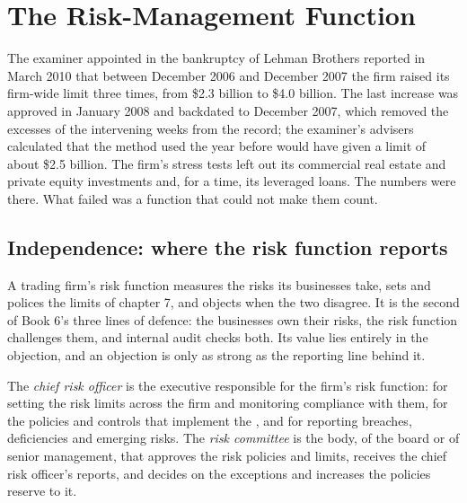 \chapter{The Risk-Management Function}\label{ch:fm:the-risk-management-function}

The examiner appointed in the bankruptcy of Lehman Brothers reported in March 2010 that between December 2006 and December 2007 the firm raised its
firm-wide  limit three times, from \$2.3 billion to \$4.0 billion. The last increase was approved in January 2008 and backdated to
December 2007, which removed the excesses of the intervening weeks from the record; the examiner's advisers calculated that the method used the year
before would have given a limit of about \$2.5 billion. The firm's stress tests left out its commercial real estate and private equity investments
and, for a time, its leveraged loans. The numbers were there. What failed was a function that could not make them count.

\section{Independence: where the risk function reports}

A trading firm's risk function measures the risks its businesses take, sets and polices the limits of chapter 7, and objects when the two disagree.
It is the second of Book 6's three lines of defence: the businesses own their risks, the risk function challenges them, and internal audit checks
both. Its value lies entirely in the objection, and an objection is only as strong as the reporting line behind it.

\begin{definition}\label{def:fm:the-risk-management-function:cro}
The \emph{chief risk officer} is the executive responsible for the firm's risk function: for setting the risk limits across
the firm and monitoring compliance with them, for the policies and controls that implement the , and for reporting breaches, deficiencies
and emerging risks. The \emph{risk committee} is the body, of the board or of senior management, that approves the risk
policies and limits, receives the chief risk officer's reports, and decides on the exceptions and increases the policies reserve to it.
\end{definition}

